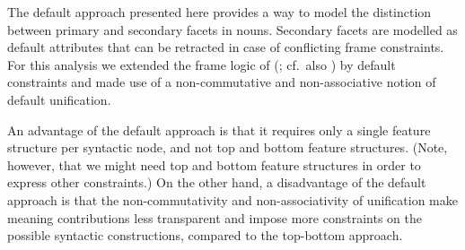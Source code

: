 \documentclass[output=paper,colorlinks,citecolor=brown,chinesefont]{langscibook}
\begin{document}

The default approach presented here provides a way to model the distinction between primary and secondary facets in  nouns. Secondary facets are modelled as default attributes that can be retracted in case of conflicting frame constraints.
For this analysis we extended the frame logic of \citeauthor{kallmeyer2013syntax} (\citeyear{kallmeyer2013syntax}; cf.\ also \citealt{chen2022frame}) by default constraints and made use of a non-commutative and non-associative notion of default unification.



An advantage of the default approach is that it requires only a single feature structure per syntactic node, and not top and bottom feature structures. (Note, however, that we might need top and bottom feature structures in order to express other constraints.) %
 On the other hand, a  disadvantage of the default approach is that the non-commutativity and non-associativity of unification make meaning contributions less transparent and impose more constraints on the possible syntactic constructions, compared to the top-bottom approach. 
\end{document}
